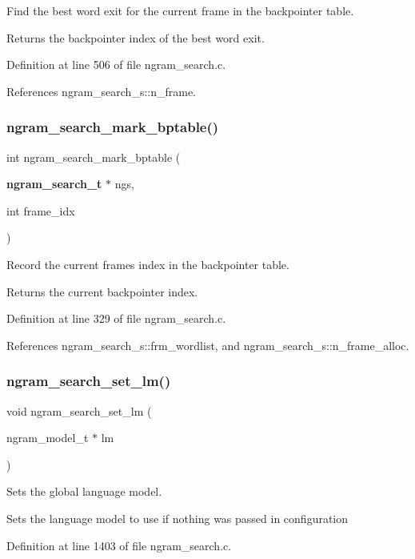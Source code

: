 Find the best word exit for the current frame in the backpointer table. 

\begin{DoxyReturn}{Returns}
the backpointer index of the best word exit. 
\end{DoxyReturn}


Definition at line 506 of file ngram\+\_\+search.\+c.



References ngram\+\_\+search\+\_\+s\+::n\+\_\+frame.

\mbox{\label{ngram__search_8c_a7772e007b7d7fdf437c87aeb08b59c71}} 
\subsubsection{ngram\+\_\+search\+\_\+mark\+\_\+bptable()}
{\footnotesize\ttfamily int ngram\+\_\+search\+\_\+mark\+\_\+bptable (\begin{DoxyParamCaption}\item[{\textbf{ ngram\+\_\+search\+\_\+t} $\ast$}]{ngs,  }\item[{int}]{frame\+\_\+idx }\end{DoxyParamCaption})}



Record the current frame\textquotesingle{}s index in the backpointer table. 

\begin{DoxyReturn}{Returns}
the current backpointer index. 
\end{DoxyReturn}


Definition at line 329 of file ngram\+\_\+search.\+c.



References ngram\+\_\+search\+\_\+s\+::frm\+\_\+wordlist, and ngram\+\_\+search\+\_\+s\+::n\+\_\+frame\+\_\+alloc.

\mbox{\label{ngram__search_8c_a0e681022d3fa0e63da066aad123245e7}} 
\subsubsection{ngram\+\_\+search\+\_\+set\+\_\+lm()}
{\footnotesize\ttfamily void ngram\+\_\+search\+\_\+set\+\_\+lm (\begin{DoxyParamCaption}\item[{ngram\+\_\+model\+\_\+t $\ast$}]{lm }\end{DoxyParamCaption})}



Sets the global language model. 

Sets the language model to use if nothing was passed in configuration 

Definition at line 1403 of file ngram\+\_\+search.\+c.


